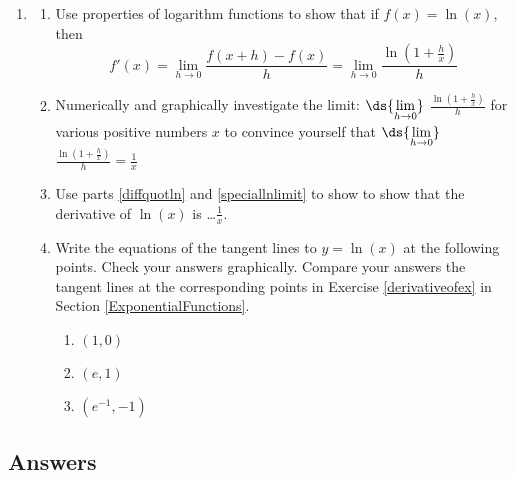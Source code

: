 \documentclass{ximera}
\begin{document}
\begin{enumerate}
\setcounter{enumi}{\value{HW}}



\item\label{derivativeofln} \begin{enumerate}  \item\label{diffquotln}  Use properties of logarithm functions to show that if $f(x) = \ln(x)$, then \[ f'(x) = \lim_{h \rightarrow 0} \frac{f(x+h) - f(x)}{h} = \lim_{h \rightarrow 0} \dfrac{\ln\left( 1 + \frac{h}{x} \right)}{h} \]

\item\label{speciallnlimit}    Numerically and graphically investigate the limit: $\ds{\lim_{h \rightarrow 0}}$ $\frac{\ln\left( 1 + \frac{h}{x} \right)}{h}$ for various positive numbers $x$ to convince yourself that   $\ds{\lim_{h \rightarrow 0}}$ $\frac{\ln\left( 1 + \frac{h}{x} \right)}{h} = \frac{1}{x}$

\item  Use parts \ref{diffquotln} and \ref{speciallnlimit} to show to show that the derivative of $\ln(x)$ is \ldots  $\frac{1}{x}$.

\item  Write the equations of the tangent lines to $y = \ln(x) $ at the following points.   Check your answers graphically.  Compare your answers the tangent lines at the corresponding points in Exercise \ref{derivativeofex} in Section \ref{ExponentialFunctions}.



\begin{multicols}{3}
\begin{enumerate}

\item  $(1,0)$

\item  $(e, 1)$

\item $\left(e^{-1}, -1 \right)$

\end{enumerate}
\end{multicols}

\end{enumerate}

\setcounter{HW}{\value{enumi}}
\end{enumerate}




\newpage

\subsection{Answers}
\end{document}
